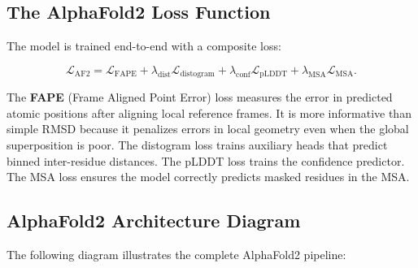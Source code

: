 \subsection{The AlphaFold2 Loss Function}

The model is trained end-to-end with a composite loss:

\begin{equation}
\mathcal{L}_{\mathrm{AF2}} = \mathcal{L}_{\mathrm{FAPE}} + \lambda_{\mathrm{dist}} \mathcal{L}_{\mathrm{distogram}} + \lambda_{\mathrm{conf}} \mathcal{L}_{\mathrm{pLDDT}} + \lambda_{\mathrm{MSA}} \mathcal{L}_{\mathrm{MSA}}.
\label{eq:alphafold-loss}
\end{equation}

The \textbf{FAPE} (Frame Aligned Point Error) loss measures the error in predicted atomic positions after aligning local reference frames. It is more informative than simple RMSD because it penalizes errors in local geometry even when the global superposition is poor. The distogram loss trains auxiliary heads that predict binned inter-residue distances. The pLDDT loss trains the confidence predictor. The MSA loss ensures the model correctly predicts masked residues in the MSA.

\newpage
\subsection{AlphaFold2 Architecture Diagram}

The following diagram illustrates the complete AlphaFold2 pipeline:

